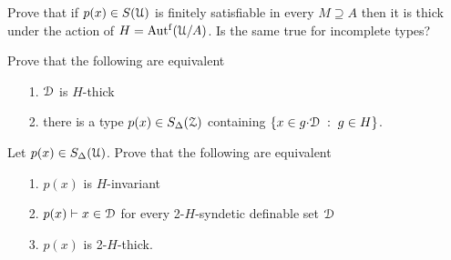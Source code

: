 


\begin{exercise}
  Prove that if $p(x)\in S(\EuScript U)$ is finitely satisfiable in every $M\supseteq A$ then it is thick under the action of $H=\mbox{Aut$^{\rm f}$}(\EuScript U/A)$.
  Is the same true for incomplete types?
\end{exercise}

\begin{exercise}
  Prove that the following are equivalent
  \begin{itemize}
    \item[1.] $\EuScript D$ is $H$-thick
    \item[2.] there is a type $p(x)\in S_\Delta(\EuScript Z)$ containing $\{x\in g{\cdot}\EuScript D\;:\;g\in H\}$.
  \end{itemize}
\end{exercise}

\begin{exercise}
  Let $p(x)\in S_\Delta(\EuScript U)$.
  Prove that the following are equivalent
  \begin{itemize}
    \item[1.] $p(x)$ is $H$-invariant
    \item[2.] $p(x)\vdash x\in\EuScript D$ for every 2-$H$-syndetic definable set $\EuScript D$
    \item[3.] $p(x)$ is 2-$H$-thick.
  \end{itemize}
\end{exercise}

